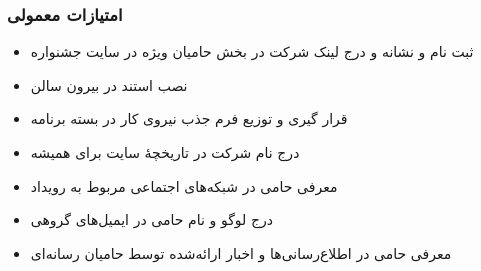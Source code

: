 \documentclass{article}
\begin{document}
\subsubsection{امتیازات معمولی}
\begin{flushright}


\begin{itemize}
\item ثبت نام و نشانه و درج لینک شرکت در بخش حامیان ویژه در سایت جشنواره
\item نصب استند در بیرون سالن
\item قرار گیری و توزیع فرم جذب نیروی کار در بسته برنامه
\item درج نام شرکت در تاریخچهٔ سایت برای همیشه
\item معرفی حامی در شبکه‌های اجتماعی مربوط به رویداد
\item درج لوگو و نام حامی در ایمیل‌های گروهی
\item معرفی حامی در اطلاع‌رسانی‌ها و اخبار ارائه‌شده توسط حامیان رسانه‌ای
\end{itemize}
\end{flushright}
\end{document}

